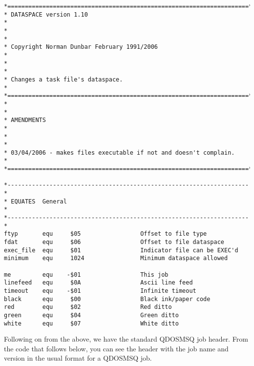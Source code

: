\begin{lstlisting}[firstnumber=1,caption={Dataspace Program - Equates etc}]
*=====================================================================*
* DATASPACE version 1.10                                              *
*                                                                     *
* Copyright Norman Dunbar February 1991/2006                          *
*                                                                     *
* Changes a task file's dataspace.                                    *
*=====================================================================*
*                                                                     *
* AMENDMENTS                                                          *
*                                                                     *
* 03/04/2006 - makes files executable if not and doesn't complain.    *
*=====================================================================*

*---------------------------------------------------------------------*
* EQUATES  General                                                    *
*---------------------------------------------------------------------*
ftyp       equ     $05                 Offset to file type
fdat       equ     $06                 Offset to file dataspace
exec_file  equ     $01                 Indicator file can be EXEC'd
minimum    equ     1024                Minimum dataspace allowed

me         equ    -$01                 This job
linefeed   equ     $0A                 Ascii line feed
timeout    equ    -$01                 Infinite timeout
black      equ     $00                 Black ink/paper code
red        equ     $02                 Red ditto
green      equ     $04                 Green ditto
white      equ     $07                 White ditto
\end{lstlisting}

Following on from the above, we have the standard QDOSMSQ job
    header. From the code that follows below, you can see the header with the
    job name and version in the usual format for a QDOSMSQ job.


